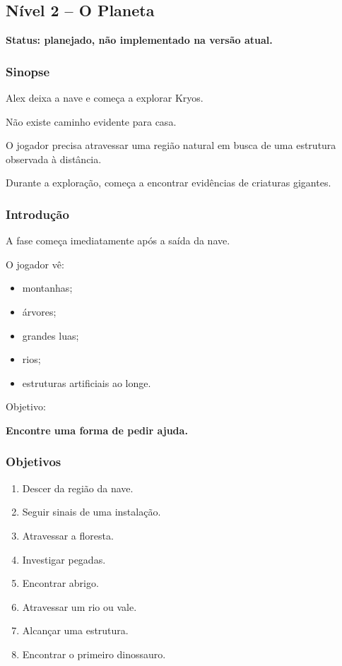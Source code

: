 \documentclass[12pt,a4paper]{article}
\begin{document}
\subsection{Nível 2 -- O Planeta}

\textbf{Status: planejado, não implementado na versão atual.}


\subsubsection*{Sinopse}

Alex deixa a nave e começa a explorar Kryos.

Não existe caminho evidente para casa.

O jogador precisa atravessar uma região natural em busca de uma
estrutura observada à distância.

Durante a exploração, começa a encontrar evidências de criaturas
gigantes.

\subsubsection*{Introdução}

A fase começa imediatamente após a saída da nave.

O jogador vê:

\begin{itemize}
    \item montanhas;
    \item árvores;
    \item grandes luas;
    \item rios;
    \item estruturas artificiais ao longe.
\end{itemize}

Objetivo:

\begin{center}
\textbf{Encontre uma forma de pedir ajuda.}
\end{center}

\subsubsection*{Objetivos}

\begin{enumerate}
    \item Descer da região da nave.
    \item Seguir sinais de uma instalação.
    \item Atravessar a floresta.
    \item Investigar pegadas.
    \item Encontrar abrigo.
    \item Atravessar um rio ou vale.
    \item Alcançar uma estrutura.
    \item Encontrar o primeiro dinossauro.
\end{enumerate}
\end{document}
